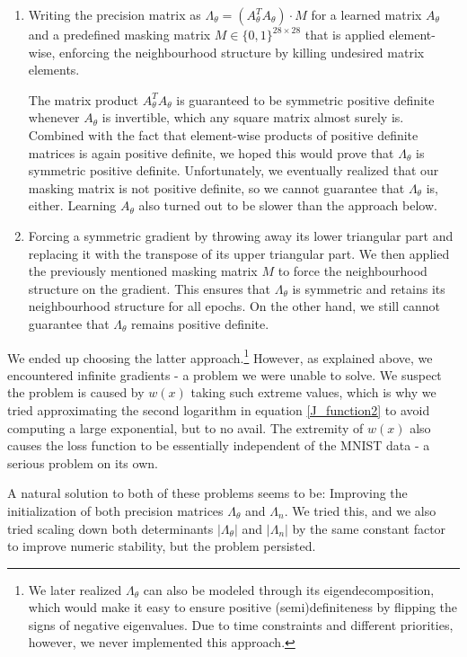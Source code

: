\documentclass[a4paper]{article}
\theoremstyle{definition}
\theoremstyle{plain}
\begin{document}
\begin{enumerate}
\item Writing the precision matrix as $\Lambda_\theta = (A_\theta ^T A_\theta) \cdot M$ for a learned matrix $A_\theta$ and a pre\-defined masking matrix $M \in \{0,1\}^{28\times 28}$ that is applied element-wise, enforcing the neighbourhood structure by killing undesired matrix elements.

The matrix product $A_\theta^T A_\theta$ is guaranteed to be symmetric positive definite whenever $A_\theta$ is invertible, which any square matrix almost surely is. Combined with the fact that element-wise products of positive definite matrices is again positive definite, we hoped this would prove that $\Lambda_\theta$ is symmetric positive definite. Unfortunately, we eventually realized that our masking matrix is not positive definite, so we cannot guarantee that $\Lambda_\theta$ is, either. Learning $A_\theta$ also turned out to be slower than the approach below.

\item Forcing a symmetric gradient by throwing away its lower triangular part and replacing it with the transpose of its upper triangular part. We then applied the previously mentioned masking matrix $M$ to force the neighbourhood structure on the gradient. This ensures that $\Lambda_\theta$ is symmetric and retains its neighbourhood structure for all epochs. On the other hand, we still cannot guarantee that $\Lambda_\theta$ remains positive definite.
\end{enumerate}
We ended up choosing the latter approach.\footnote{We later realized $\Lambda_\theta$ can also be modeled through its eigendecomposition, which would make it easy to ensure positive (semi)definiteness by flipping the signs of negative eigenvalues. Due to time constraints and different priorities, however, we never implemented this approach.} However, as explained above, we encountered infinite gradients - a problem we were unable to solve. We suspect the problem is caused by $w(x)$ taking such extreme values, which is why we tried approximating the second logarithm in equation \eqref{J_function2} to avoid computing a large exponential, but to no avail. The extremity of $w(x)$ also causes the loss function to be essentially independent of the MNIST data - a serious problem on its own.

A natural solution to both of these problems seems to be: Improving the initialization of both precision matrices $\Lambda_\theta$ and $\Lambda_n$. We tried this, and we also tried scaling down both determinants $|\Lambda_\theta|$ and $|\Lambda_n|$ by the same constant factor to improve numeric stability, but the problem persisted.
\end{document}
